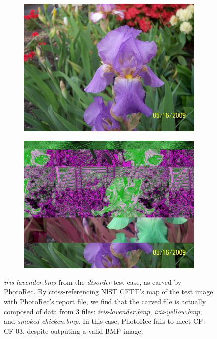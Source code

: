 \begin{figure}
    \centering
    \begin{subfigure}{0.45\linewidth}
        \includegraphics[width=\linewidth]{fig/iris-lavender.jpg}
    \end{subfigure}
    \begin{subfigure}{0.45\linewidth}
        \includegraphics[width=\linewidth]{fig/CR3_fail.png}
    \end{subfigure}
    \caption{
        \emph{iris-lavender.bmp} from the \emph{disorder} test case, as carved by PhotoRec.
        By cross-referencing NIST CFTT's map of the test image with PhotoRec's report file, we find  that the carved file is actually composed of data from 3 files: \emph{iris-lavender.bmp}, \emph{iris-yellow.bmp}, and \emph{smoked-chicken.bmp}.
        In this case, PhotoRec fails to meet CF-CF-03, despite outputing a valid BMP image.
        }
    \label{fig:CR3_fail}
\end{figure}


